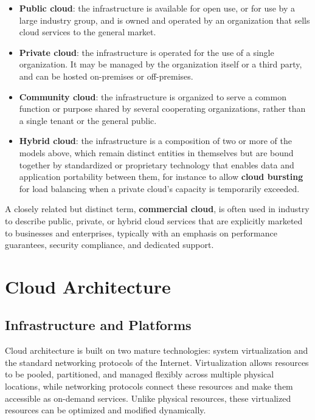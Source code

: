 \begin{itemize}
    \item \textbf{Public cloud}: the infrastructure is available for open use, or for use by a large industry group, and is owned and operated by an organization that sells cloud services to the general market.
    \item \textbf{Private cloud}: the infrastructure is operated for the use of a single organization. It may be managed by the organization itself or a third party, and can be hosted on-premises or off-premises.
    \item \textbf{Community cloud}: the infrastructure is organized to serve a common function or purpose shared by several cooperating organizations, rather than a single tenant or the general public.
    \item \textbf{Hybrid cloud}: the infrastructure is a composition of two or more of the models above, which remain distinct entities in themselves but are bound together by standardized or proprietary technology that enables data and application portability between them, for instance to allow \textbf{cloud bursting} for load balancing when a private cloud's capacity is temporarily exceeded.
\end{itemize}

A closely related but distinct term, \textbf{commercial cloud}, is often used in industry to describe public, private, or hybrid cloud services that are explicitly marketed to businesses and enterprises, typically with an emphasis on performance guarantees, security compliance, and dedicated support.

\vspace{-0.5em}

\section{Cloud Architecture} \label{sec:cloud_architecture}

\subsection{Infrastructure and Platforms}

Cloud architecture is built on two mature technologies: system virtualization and the standard networking protocols of the Internet. Virtualization allows resources to be pooled, partitioned, and managed flexibly across multiple physical locations, while networking protocols connect these resources and make them accessible as on-demand services. Unlike physical resources, these virtualized resources can be optimized and modified dynamically.

